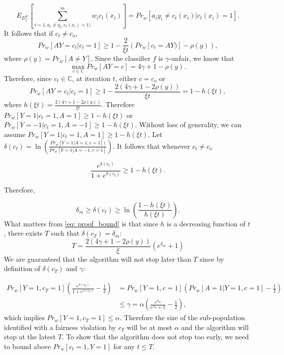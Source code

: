 \documentclass{article}
\begin{document}
\begin{equation}
E_{D_{f}^{w}}\left[\displaystyle\sum_{i=1, a_{i}\neq y_{i}, c_{t}(x_{i})=1) }^{m} w_{i}c_{t}(x_{i})\right] = Pr_{w}[a_{i}y_{i}\neq c_{t}(x_{i})| c_{t}(x_{i})=1].
\end{equation}
It follows that if $c_{t}\neq c_{o}$, 
\begin{equation}
Pr_{w}[AY=c_{t}|c_{t}=1] \geq 1 - \frac{2}{\xi t}\left(Pr_{w}[c_{t}=AY)] - \rho(y)\right),
\end{equation}
where $\rho(y) = Pr_{w}[A\neq Y]$. 
Since the classifier $f$ is $\gamma$-unfair, we know that 
\begin{equation}
\max_{c\in\mathbb{C}}Pr_{w}[AY=c] = 4\gamma + 1 - \rho(y). 
\end{equation} 
Therefore, since $c_{t}\in \mathbb{C}$, at iteration $t$, either $c=c_{o}$ or
\begin{equation}
\label{eq: bound}
Pr_{w}[AY=c_{t}|c_{t}=1] \geq 1 - \frac{2(4\gamma + 1 - 2\rho(y))}{\xi t}= 1-h(\xi t),
\end{equation}
where $h(\xi t) = \frac{2(4\gamma + 1 - 2\rho(y))}{\xi t}$.
Therefore $Pr_{w}[Y=1|c_{t}=1, A=1] \geq 1-h(\xi t)$ or $Pr_{w}[Y=-1|c_{t}=1, A=-1] \geq 1-h(\xi t)$. Without loss of generality, we can assume $Pr_{w}[Y=1|c_{t}=1, A=1] \geq 1-h(\xi t)$. Let $\delta(c_{t}) = \ln\left(\frac{Pr_{w}[Y=1|A=1, c=1])}{Pr_{w}[Y=1|A=-1, c=1]}\right)$. It follows that whenever $c_{t}\neq c_{o}$

\begin{equation}
\frac{e^{\delta(c_{t})}}{1 + e^{\delta(c_{t})}} \geq 1 -h(\xi t).
\end{equation}

Therefore,

\begin{equation}
\label{eq: proof_bound}
\delta_{m}\geq\delta(c_{t})\geq \ln\left(\frac{1-h(\xi t)}{h(\xi t)}\right).
\end{equation}
What matters from \eqref{eq: proof_bound} is that since $h$ is a decreasing function of $t$, there exists $T$ such that $\delta(c_{T}) = \delta_{m}$:
\begin{equation}
T = \frac{2(4\gamma + 1-2\rho(y))}{\xi} \left(e^{\delta_{m}} + 1\right)
\end{equation}
We are guaranteed that the algorithm will not stop later than $T$ since by definition of $\delta(c_{T})$ and $\gamma$:

\begin{equation}
\begin{split}
Pr_{w}[Y=1,c_{T}=1]\left(\frac{e^{\delta(c_{T})}}{1 + e^{\delta(c_{T})}}-\frac{1}{2}\right)&=Pr_{w}[Y=1,c=1]\left(Pr_{w}[A=1| Y=1, c=1] - \frac{1}{2}\right)\\
& \leq \gamma = \alpha\left(\frac{e^{\delta_{m}}}{e^{\delta_{m}}+ 1}- \frac{1}{2}\right),
\end{split}
\end{equation}
which implies $Pr_{w}[Y=1,c_{T}=1]\leq \alpha$. Therefore the size of the sub-population identified with a fairness violation by $c_{T}$ will be at most $\alpha$ and the algorithm will stop at the latest $T$. To show that the algorithm does not stop too early, we need to bound above $Pr_{w}[c_{t}=1, Y=1]$ for any $t\leq T$. 
\end{document}
